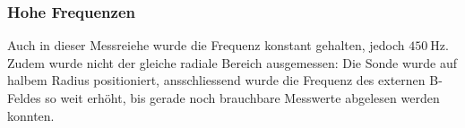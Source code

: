 {    %
    \subsubsection{Hohe Frequenzen}
    \label{sec:ausw:subsec:vollz:subsubsec:highfreq}

	\begin{minipage}[t]{0.33\textwidth}
        \vspace{0mm}
        Auch  in  dieser  Messreiehe  wurde die  Frequenz  konstant  gehalten,
        jedoch  $\SI{450}{\hertz}$. Zudem  wurde  nicht  der  gleiche  radiale
        Bereich ausgemessen: Die  Sonde wurde auf halbem  Radius positioniert,
        ansschliessend  wurde  die  Frequenz  des externen  B-Feldes  so  weit
        erh\"oht,  bis  gerade  noch  brauchbare  Messwerte  abgelesen  werden
        konnten.



\end{minipage}}
